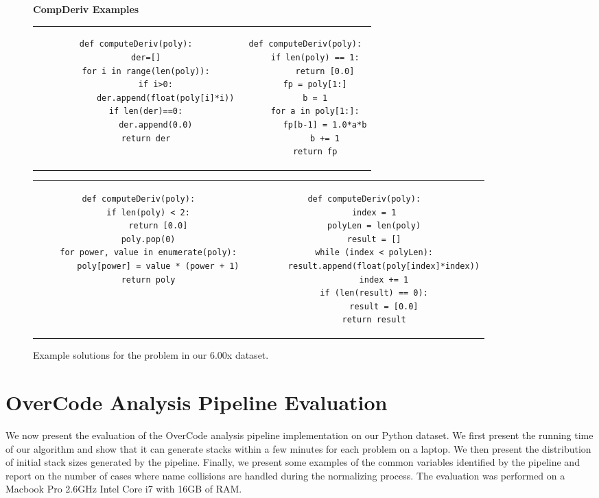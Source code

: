 \begin{figure}
{\bf CompDeriv Examples}\\
\begin{tabular}{cc} 
\begin{minipage}{0.5\linewidth}
\begin{lstlisting}[]
def computeDeriv(poly):
    der=[]
    for i in range(len(poly)):
        if i>0:
            der.append(float(poly[i]*i))
    if len(der)==0:
        der.append(0.0)
    return der

\end{lstlisting}
\end{minipage}
&
\begin{minipage}{0.5\linewidth}
\begin{lstlisting}[]
def computeDeriv(poly):
    if len(poly) == 1:
        return [0.0]
    fp = poly[1:]
    b = 1
    for a in poly[1:]:
        fp[b-1] = 1.0*a*b
        b += 1
    return fp
\end{lstlisting}
\end{minipage}
\\
\end{tabular}
\begin{tabular}{c c}
\begin{minipage}{0.4\linewidth}
\begin{lstlisting}[]
def computeDeriv(poly):
    if len(poly) < 2:
        return [0.0]
    poly.pop(0)
    for power, value in enumerate(poly):
        poly[power] = value * (power + 1)
    return poly
\end{lstlisting}
\end{minipage}
&
\begin{minipage}{0.4\linewidth}
\begin{lstlisting}[]
def computeDeriv(poly):
    index = 1
    polyLen = len(poly)
    result = []
    while (index < polyLen):
        result.append(float(poly[index]*index))
        index += 1
    if (len(result) == 0):
        result = [0.0]
    return result
\end{lstlisting}
\end{minipage}

\end{tabular}
\caption{Example solutions for the  problem in our 6.00x dataset.}
\label{cdexamples}
\end{figure}


\section{OverCode Analysis Pipeline Evaluation}
We now present the evaluation of the OverCode analysis pipeline implementation on our Python dataset. We first present the running time of our algorithm and show that it can generate stacks within a few minutes for each problem on a laptop. We then present the distribution of initial stack sizes generated by the pipeline. Finally, we present some examples of the common variables identified by the pipeline and report on the number of cases where name collisions are handled during the normalizing process. The evaluation was performed on a Macbook Pro 2.6GHz Intel Core i7 with 16GB of RAM.  

